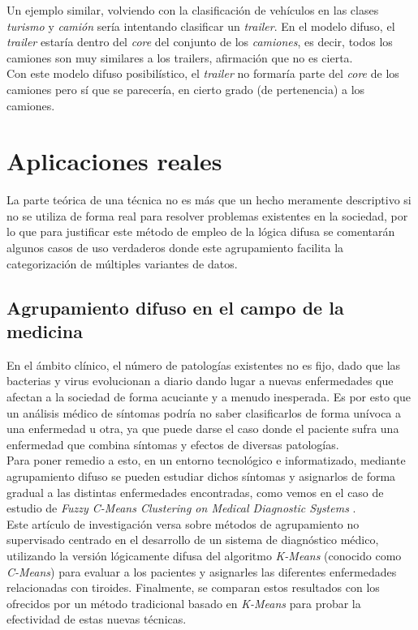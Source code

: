 \documentclass[]{report}
\begin{document}
			Un ejemplo similar, volviendo con la clasificación de vehículos en las clases \textit{turismo} y \textit{camión} sería intentando clasificar un \textit{trailer}. En el modelo difuso, el \textit{trailer} estaría dentro del \textit{core} del conjunto de los \textit{camiones}, es decir, todos los camiones son muy similares a los trailers, afirmación que no es cierta.\\
			
			Con este modelo difuso posibilístico, el \textit{trailer} no formaría parte del \textit{core} de los camiones pero sí que se parecería, en cierto grado (de pertenencia) a los camiones.

	\chapter{Aplicaciones reales}
	
		La parte teórica de una técnica no es más que un hecho meramente descriptivo si no se utiliza de forma real para resolver problemas existentes en la sociedad, por lo que para justificar este método de empleo de la lógica difusa se comentarán algunos casos de uso verdaderos donde este agrupamiento facilita la categorización de múltiples variantes de datos.\\
		
		\section{Agrupamiento difuso en el campo de la medicina}
		
			En el ámbito clínico, el número de patologías existentes no es fijo, dado que las bacterias y virus evolucionan a diario dando lugar a nuevas enfermedades que afectan a la sociedad de forma acuciante y a menudo inesperada. Es por esto que un análisis médico de síntomas podría no saber clasificarlos de forma unívoca a una enfermedad u otra, ya que puede darse el caso donde el paciente sufra una enfermedad que combina síntomas y efectos de diversas patologías.\\
			
			Para poner remedio a esto, en un entorno tecnológico e informatizado, mediante agrupamiento difuso se pueden estudiar dichos síntomas y asignarlos de forma gradual a las distintas enfermedades encontradas, como vemos en el caso de estudio de \textit{Fuzzy C-Means Clustering on Medical Diagnostic Systems} \cite{medicine}.\\
			
			Este artículo de investigación versa sobre métodos de agrupamiento no supervisado centrado en el desarrollo de un sistema de diagnóstico médico, utilizando la versión lógicamente difusa del algoritmo \textit{K-Means} (conocido como \textit{C-Means}) para evaluar a los pacientes y asignarles las diferentes enfermedades relacionadas con tiroides. Finalmente, se comparan estos resultados con los ofrecidos por un método tradicional basado en \textit{K-Means} para probar la efectividad de estas nuevas técnicas.
			
\end{document}
